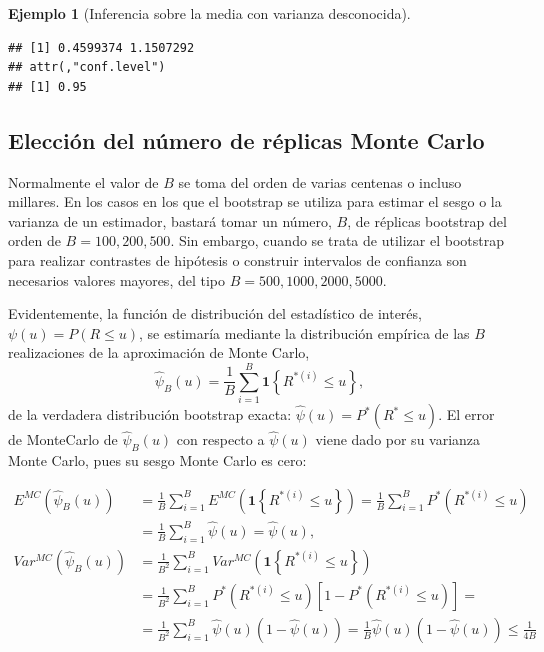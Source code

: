 \documentclass[
]{book}
\newenvironment{Shaded}{\begin{snugshade}}{\end{snugshade}}
\newcommand{\FunctionTok}[1]{\textcolor[rgb]{0.13,0.29,0.53}{\textbf{#1}}}
\newcommand{\NormalTok}[1]{#1}
\newcommand{\SpecialCharTok}[1]{\textcolor[rgb]{0.81,0.36,0.00}{\textbf{#1}}}
\renewcommand{\mathbf}[1]{\symbf{#1}}
\theoremstyle{break}
\newtheorem{example}{Ejemplo}[chapter]
\theoremstyle{nonumberplain}
\begin{document}
\begin{example}[Inferencia sobre la media con varianza desconocida]
\begin{Shaded}
\end{Shaded}

\begin{verbatim}
## [1] 0.4599374 1.1507292
## attr(,"conf.level")
## [1] 0.95
\end{verbatim}

\end{example}

\subsection{Elección del número de réplicas Monte Carlo}\label{elecciuxf3n-del-nuxfamero-de-ruxe9plicas-monte-carlo}

Normalmente el valor de \(B\) se toma del orden de varias centenas o
incluso millares. En los casos en los que el bootstrap se utiliza para
estimar el sesgo o la varianza de un estimador, bastará tomar un número,
\(B\), de réplicas bootstrap del orden de \(B = 100, 200, 500\). Sin embargo,
cuando se trata de utilizar el bootstrap para realizar contrastes de
hipótesis o construir intervalos de confianza son necesarios valores
mayores, del tipo \(B = 500, 1000, 2000, 5000\).

Evidentemente, la función de distribución del estadístico de interés,
\(\psi \left( u \right) =P\left( R\leq u \right)\), se estimaría mediante
la distribución empírica de las \(B\) realizaciones de la aproximación de
Monte Carlo,
\[\hat{\psi}_{B}\left( u \right) =
\frac{1}{B}\sum_{i=1}^{B}\mathbf{1}\left\{ R^{\ast (i)}\leq u\right\},\]
de la verdadera distribución bootstrap exacta:
\(\hat{\psi}\left(u \right) =P^{\ast}\left( R^{\ast}\leq u \right)\).
El error de MonteCarlo de \(\hat{\psi}_{B}\left( u \right)\) con respecto
a \(\hat{\psi}\left( u \right)\) viene dado por su varianza Monte Carlo,
pues su sesgo Monte Carlo es cero:

\[\begin{aligned}
E^{MC}\left( \hat{\psi}_{B}\left( u \right) \right) &= \frac{1}{B}
\sum_{i=1}^{B}E^{MC}\left( \mathbf{1}\left\{ R^{\ast (i)}\leq
u\right\} \right) =\frac{1}{B}\sum_{i=1}^{B}P^{\ast}\left( R^{\ast \left(
i \right)}\leq u \right) \\
&= \frac{1}{B}\sum_{i=1}^{B}\hat{\psi}\left( u \right) =\hat{\psi}\left(
u \right), \\
Var^{MC}\left( \hat{\psi}_{B}\left( u \right) \right) &= \frac{1}{B^2}
\sum_{i=1}^{B}Var^{MC}\left( \mathbf{1}\left\{ R^{\ast (i)}\leq
u\right\} \right) \\
&= \frac{1}{B^2}\sum_{i=1}^{B}P^{\ast}\left( R^{\ast (i)
}\leq u \right) \left[ 1-P^{\ast}\left( R^{\ast (i)}\leq
u \right) \right] = \\
&= \frac{1}{B^2}\sum_{i=1}^{B}\hat{\psi}\left( u \right) \left( 1-\hat{\psi}
\left( u \right) \right) =\frac{1}{B}\hat{\psi}\left( u \right) \left( 1-\hat{
\psi}\left( u \right) \right) \leq \frac{1}{4B}
\end{aligned}\]
\end{document}
